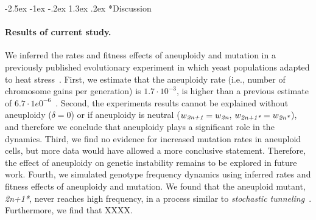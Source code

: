 \documentclass[12pt]{extarticle}
\makeatletter
\renewcommand\section{\@startsection {section}{1}{\z@}%
     {-2.5ex \@plus -1ex \@minus -.2ex}%
     {1.3ex \@plus.2ex}%
    {\Large\bfseries}}
\newcommand{\euwt}{\emph{2n}}
\newcommand{\anwt}{\emph{2n+1}}
\newcommand{\eumt}{\emph{2n*}}
\newcommand{\anmt}{\emph{2n+1*}}
\makeatother
\begin{document}

\section*{Discussion}

\paragraph*{Results of current study.}
We inferred the rates and fitness effects of aneuploidy and mutation in a previously published evolutionary experiment in which yeast populations adapted to heat stress~\citep{Yona2012}. 
First, we estimate that the aneuploidy rate (i.e., number of chromosome gains per generation) is $1.7 \cdot 10^{-3}$, is higher than a previous estimate of $6.7 \cdot 1e0^{-6}$~\citep{Zhu2016}. %
Second, the experiments results cannot be explained without aneuploidy ($\delta=0$) or if aneuploidy is neutral ($w_{\anwt}=w_{\euwt}$, $w_{\anmt}=w_{\eumt}$), and therefore we conclude that aneuploidy plays a significant role in the dynamics.
Third, we find no evidence for increased mutation rates in aneuploid cells, but more data would have allowed a more conclusive statement. Therefore, the effect of aneuploidy on genetic instability remains to be explored in future work.
Fourth, we simulated genotype frequency dynamics using inferred rates and fitness effects of aneuploidy and mutation. We found that the aneuploid mutant, \anmt, never reaches high frequency, in a process similar to \emph{stochastic tunneling}~\citep{Iwasa2004}. %
Furthermore, we find that XXXX. %
\end{document}
